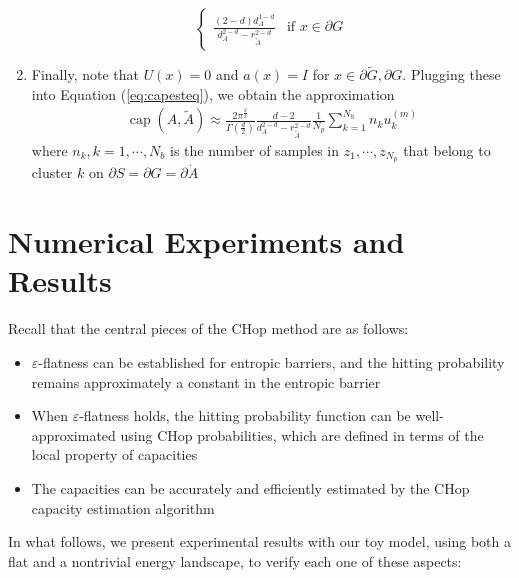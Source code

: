 \documentclass[english, aip, jcp, priprint, graphicx]{revtex4-1}
\theoremstyle{plain}
\theoremstyle{definition}
\theoremstyle{plain}
\begin{document}
\begin{enumerate}
\[\begin{cases}
	\frac{(2 - d) d_A^{1 - d}}{d_A^{2 - d} - r_{\tilde{A}}^{2 - d}} & \text{if }x \in \partial G
\end{cases}
\]
\item Finally, note that $U (x) = 0$ and $a (x) = I$ for $x
\in \partial \tilde{G},\partial G$.  Plugging these into Equation (\ref{eq:capesteq}), we obtain the approximation
%
\begin{gather}
	\ensuremath{\operatorname{cap}} (A, \tilde{A}) \approx \frac{2\pi^{\frac{d}{2}}}{\Gamma(\frac{d}{2})}\frac{d-2}{d_A^{2-d}-r_{\tilde A}^{2-d}}\frac{1}{N_p} \sum_{k=1}^{N_b}n_k u_k^{(m)}
\end{gather}
where $n_k, k=1, \cdots, N_b$ is the number of samples in $z_1, \cdots, z_{N_p}$ that belong to cluster $k$ on $\partial S=\partial G=\partial \dot{A}$
%
\end{enumerate}
\section{Numerical Experiments and Results}\label{sec:experiments}

Recall that the central pieces of the CHop method are as follows:

\begin{itemize}
\item $\varepsilon$-flatness can be established for entropic barriers, and the hitting probability remains approximately a constant in the entropic barrier
\item When $\varepsilon$-flatness holds, the hitting probability function can be well-approximated using CHop probabilities, which are defined in terms of the local property of capacities
\item The capacities can be accurately and efficiently estimated by the CHop capacity estimation algorithm
\end{itemize}

In what follows, we present experimental results with our toy model, using both a flat and a nontrivial energy landscape, to verify each one of these aspects:
\end{document}
